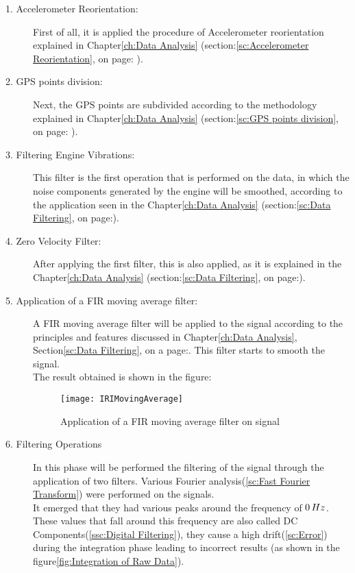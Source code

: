 \documentclass[tesi]{subfiles}
\begin{document}
\begin{description}
\item[1. Accelerometer Reorientation:] First of all, it is applied the procedure of Accelerometer reorientation explained in Chapter\ref{ch:Data Analysis} (section:\ref{sc:Accelerometer Reorientation}, on page: \pageref{sc:Accelerometer Reorientation}).
\item[2. GPS points division:] Next, the GPS points are subdivided according to the methodology explained in Chapter\ref{ch:Data Analysis} (section:\ref{sc:GPS points division}, on page: \pageref{sc:GPS points division}).
\item[3. Filtering Engine Vibrations:] This filter is the first operation that is performed on the data, in which the noise components generated by the engine will be smoothed, according to the application seen in the Chapter\ref{ch:Data Analysis} (section:\ref{sc:Data Filtering}, on page:\pageref{sssc:Remove Engine Vibrations Filter}).\\
\item[4. Zero Velocity Filter:] After applying the first filter, this is also applied, as it is explained in the Chapter\ref{ch:Data Analysis} (section:\ref{sc:Data Filtering}, on page:\pageref{sssc:Zero Velocity Filter}).\\
\item[5. Application of a FIR moving average filter:] A FIR moving average filter will be applied to the signal according to the principles and features discussed in Chapter\ref{ch:Data Analysis}, Section\ref{sc:Data Filtering}, on a page:\pageref{p:moving_average}. 
This filter starts to smooth the signal.\\
The result obtained is shown in the figure:
\begin{figure}[H]
\centering
\texttt{[image: IRIMovingAverage]}
\caption{Application of a FIR moving average filter on signal}
\end{figure}
\item[6. Filtering Operations]
In this phase will be performed the filtering of the signal through the application of two filters. 
Various Fourier analysis(\ref{sc:Fast Fourier Transform}) were performed on the signals.\\
It emerged that they had various peaks around the frequency of $0 \thinspace Hz$. These values that fall around this frequency are also called DC Components(\ref{ssc:Digital Filtering}), they cause a high drift(\ref{sc:Error}) during the integration phase leading to incorrect results (as shown in the figure\ref{fig:Integration of Raw Data}).\\

\end{description}
\end{document}
